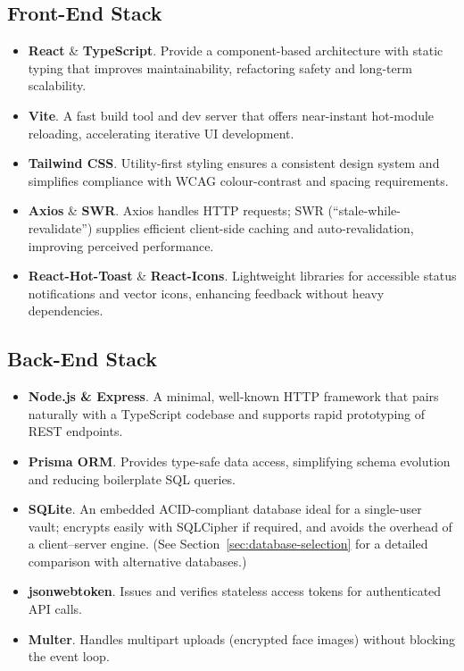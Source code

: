 \subsection*{Front-End Stack}
\begin{itemize}
  \item \textbf{React} \& \textbf{TypeScript}. Provide a component-based architecture with static typing that improves maintainability, refactoring safety and long-term scalability.
  \item \textbf{Vite}. A fast build tool and dev server that offers near-instant hot-module reloading, accelerating iterative UI development.
  \item \textbf{Tailwind CSS}. Utility-first styling ensures a consistent design system and simplifies compliance with WCAG colour-contrast and spacing requirements.
  \item \textbf{Axios} \& \textbf{SWR}. Axios handles HTTP requests; SWR (“stale-while-revalidate”) supplies efficient client-side caching and auto-revalidation, improving perceived performance.
  \item \textbf{React-Hot-Toast} \& \textbf{React-Icons}. Lightweight libraries for accessible status notifications and vector icons, enhancing feedback without heavy dependencies.
\end{itemize}

\subsection*{Back-End Stack}
\begin{itemize}
  \item \textbf{Node.js \& Express}. A minimal, well-known HTTP framework that pairs naturally with a TypeScript codebase and supports rapid prototyping of REST endpoints.
  \item \textbf{Prisma ORM}. Provides type-safe data access, simplifying schema evolution and reducing boilerplate SQL queries.
  \item \textbf{SQLite}. An embedded ACID-compliant database ideal for a single-user vault; encrypts easily with SQLCipher if required, and avoids the overhead of a client–server engine. (See Section~\ref{sec:database-selection} for a detailed comparison with alternative databases.)
  \item \textbf{jsonwebtoken}. Issues and verifies stateless access tokens for authenticated API calls.
  \item \textbf{Multer}. Handles multipart uploads (encrypted face images) without blocking the event loop.
\end{itemize}


